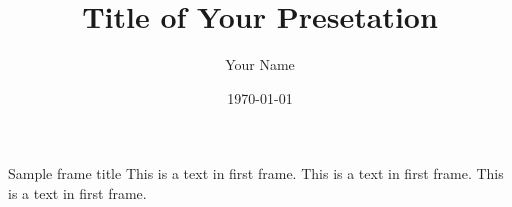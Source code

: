 \documentclass{beamer}
\title{Title of Your Presetation}
\author{Your Name}
\institute{University Name}
\date{\today}
\begin{document}
 
\begin{frame}{}
\titlepage
\end{frame}
 

\begin{frame}{Sample frame title}
This is a text in first frame. This is a text in first frame. This is a text in first frame.
\end{frame}


 
\end{document}
